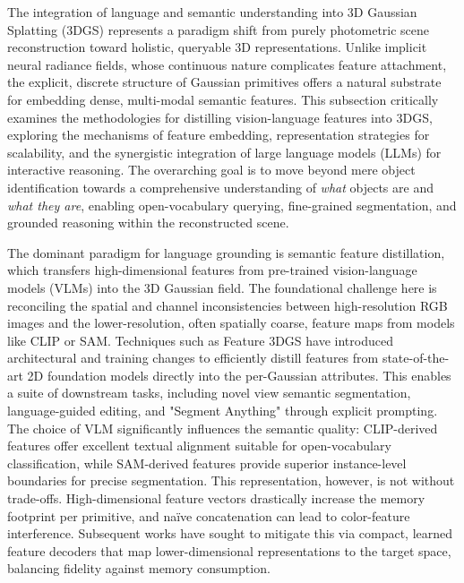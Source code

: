 \documentclass[11pt,a4paper]{article}
\begin{document}
The integration of language and semantic understanding into 3D Gaussian Splatting (3DGS) represents a paradigm shift from purely photometric scene reconstruction toward holistic, queryable 3D representations. Unlike implicit neural radiance fields, whose continuous nature complicates feature attachment, the explicit, discrete structure of Gaussian primitives offers a natural substrate for embedding dense, multi-modal semantic features. This subsection critically examines the methodologies for distilling vision-language features into 3DGS, exploring the mechanisms of feature embedding, representation strategies for scalability, and the synergistic integration of large language models (LLMs) for interactive reasoning. The overarching goal is to move beyond mere object identification towards a comprehensive understanding of \emph{what} objects are and \emph{what they are}, enabling open-vocabulary querying, fine-grained segmentation, and grounded reasoning within the reconstructed scene.

The dominant paradigm for language grounding is semantic feature distillation, which transfers high-dimensional features from pre-trained vision-language models (VLMs) into the 3D Gaussian field. The foundational challenge here is reconciling the spatial and channel inconsistencies between high-resolution RGB images and the lower-resolution, often spatially coarse, feature maps from models like CLIP or SAM. Techniques such as Feature 3DGS \cite{arxiv:2312.03203v3} have introduced architectural and training changes to efficiently distill features from state-of-the-art 2D foundation models directly into the per-Gaussian attributes. This enables a suite of downstream tasks, including novel view semantic segmentation, language-guided editing, and "Segment Anything" through explicit prompting. The choice of VLM significantly influences the semantic quality: CLIP-derived features offer excellent textual alignment suitable for open-vocabulary classification, while SAM-derived features provide superior instance-level boundaries for precise segmentation. This representation, however, is not without trade-offs. High-dimensional feature vectors drastically increase the memory footprint per primitive, and na\"{i}ve concatenation can lead to color-feature interference. Subsequent works have sought to mitigate this via compact, learned feature decoders that map lower-dimensional representations to the target space, balancing fidelity against memory consumption.
\end{document}
